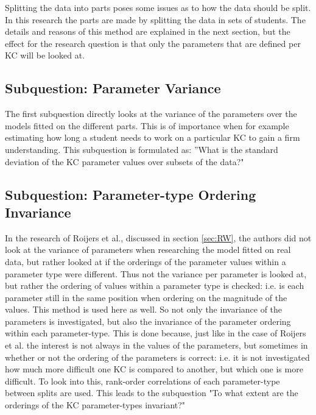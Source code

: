 \documentclass{scrartcl}
\begin{document}
Splitting the data into parts poses some issues as to how the data should be split. In this research the parts are made by splitting the data in sets of students. The details and reasons of this method are explained in the next section, but the effect for the research question is that only the parameters that are defined per KC will be looked at.

\subsection{Subquestion: Parameter Variance}
The first subquestion directly looks at the variance of the parameters over the models fitted on the different parts. This is of importance when for example estimating how long a student needs to work on a particular KC to gain a firm understanding. This subquestion is formulated as: ''What is the standard deviation of the KC parameter values over subsets of the data?"

\subsection{Subquestion: Parameter-type Ordering Invariance}
In the research of Roijers et al., discussed in section \ref{sec:RW}, the authors did not look at the variance of parameters when researching the model fitted on real data, but rather looked at if the orderings of the parameter values within a parameter type were different. Thus not the variance per parameter is looked at, but rather the ordering of values within a parameter type is checked: i.e. is each parameter still in the same position when ordering on the magnitude of the values. This method is used here as well. So not only the invariance of the parameters is investigated, but also the invariance of the parameter ordering within each parameter-type. This is done because, just like in the case of Roijers et al. the interest is not always in the values of the parameters, but sometimes in whether or not the ordering of the parameters is correct: i.e. it is not investigated how much more difficult one KC is compared to another, but which one is more difficult. To look into this, rank-order correlations of each parameter-type between splits are used. This leads to the subquestion "To what extent are the orderings of the KC parameter-types invariant?" 
\end{document}
